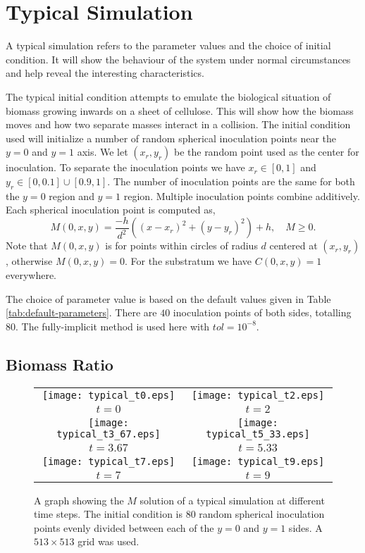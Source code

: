 \section{Typical Simulation}

A typical simulation refers to the parameter values and the choice of initial condition.
It will show the behaviour of the system under normal circumstances and help reveal the interesting characteristics.

The typical initial condition attempts to emulate the biological situation of biomass growing inwards on a sheet of cellulose.
This will show how the biomass moves and how two separate masses interact in a collision.
The initial condition used will initialize a number of random spherical inoculation points near the $y=0$ and $y=1$ axis.
We let $(x_r, y_r)$ be the random point used as the center for inoculation.
To separate the inoculation points we have $x_r \in [0,1]$ and $y_r \in [0, 0.1] \cup [0.9, 1]$.
The number of inoculation points are the same for both the $y=0$ region and $y=1$ region.
Multiple inoculation points combine additively.
Each spherical inoculation point is computed as,
\begin{equation} \label{equ:typical_initial_cond}
  M(0,x,y) = \frac{-h}{d^2} \left( (x-x_r)^2 + (y - y_r)^2 \right) + h, \quad M \ge 0.
\end{equation}
Note that $M(0,x,y)$ is for points within circles of radius $d$ centered at $(x_r, y_r)$, otherwise $M(0,x,y) = 0$.
For the substratum we have $C(0,x,y) = 1$ everywhere.

The choice of parameter value is based on the default values given in Table \ref{tab:default-parameters}.
There are $40$ inoculation points of both sides, totalling $80$.
The fully-implicit method is used here with $tol = 10^{-8}$.

\subsection{Biomass Ratio}

\begin{figure}[!htp]
  \centering
  \begin{tabular}{c c}
      \texttt{[image: typical\_t0.eps]} &
      \texttt{[image: typical\_t2.eps]} \\
      $t = 0$ & $t = 2$ \\
      \texttt{[image: typical\_t3\_67.eps]} &
      \texttt{[image: typical\_t5\_33.eps]} \\
      $t = 3.67$ & $t = 5.33$ \\
      \texttt{[image: typical\_t7.eps]} &
      \texttt{[image: typical\_t9.eps]} \\
      $t = 7$ & $t = 9$
   \end{tabular}
  \caption{A graph showing the $M$ solution of a typical simulation at different time steps.
    The initial condition is $80$ random spherical inoculation points evenly divided between each of the $y=0$ and $y=1$ sides.
    A $513 \times 513$ grid was used.  }
  \label{fig:typical_sim}
\end{figure}

